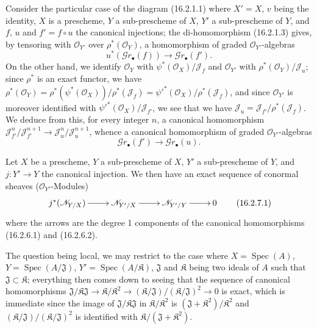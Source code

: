 \begin{env}[16.2.6]
\label{IV.16.2.6}
Consider the particular case of the diagram (16.2.1.1) where $X'=X$, $v$ being
the identity, $X$ is a prescheme, $Y$ a sub-prescheme of $X$, $Y'$ a
sub-prescheme of $Y$, and $f$, $u$ and $f'=f\circ u$ the canonical injections; the
di-homomorphism (16.2.1.3) gives, by tensoring with
$\mathcal{O}_{Y'}$ over $\rho^*(\mathcal{O}_Y)$, a homomorphism of
graded $\mathcal{O}_{Y'}$-algebras
\[
  u^*(\mathscr{G}r_\bullet(f))
  \longrightarrow\mathscr{G}r_\bullet(f').
  \tag{16.2.6.1}
  \label{IV.16.2.6.1}
\]
On the other hand, we identify $\mathcal{O}_Y$ with
$\psi^*(\mathcal{O}_X)/\mathscr{J}_f$ and $\mathcal{O}_{Y'}$ with
$\rho^*(\mathcal{O}_Y)/\mathscr{J}_u$; since $\rho^*$ is an exact functor,
we have
$\rho^*(\mathcal{O}_Y)=
\rho^*(\psi^*(\mathcal{O}_X))/\rho^*(\mathscr{J}_f)=
\psi'^*(\mathcal{O}_X)/\rho^*(\mathscr{J}_f)$, and since
$\mathcal{O}_{Y'}$ is moreover identified with
$\psi'^*(\mathcal{O}_X)/\mathscr{J}_{f'}$, we see that we have
$\mathscr{J}_u=\mathscr{J}_{f'}/\rho^*(\mathscr{J}_f)$. We deduce from this, for
every integer $n$, a canonical homomorphism
$\mathscr{J}_{f'}^n/\mathscr{J}_{f'}^{n+1}\to
\mathscr{J}_u^n/\mathscr{J}_u^{n+1}$, whence a canonical homomorphism of
graded $\mathcal{O}_{Y'}$-algebras
\[
  \mathscr{G}r_\bullet(f')
  \longrightarrow\mathscr{G}r_\bullet(u).
  \tag{16.2.6.2}
  \label{IV.16.2.6.2}
\]
\end{env}

\begin{proposition}[16.2.7]
\label{IV.16.2.7}
Let $X$ be a prescheme, $Y$ a sub-prescheme of $X$, $Y'$ a
sub-prescheme of $Y$, and $j:Y'\to Y$ the canonical injection. We then have an exact
sequence of conormal sheaves ($\mathcal{O}_{Y'}$-Modules)
\[
  \xymatrix{
    j^*(\mathscr{N}_{Y/X}) \ar[r] &
    \mathscr{N}_{Y'/X} \ar[r] &
    \mathscr{N}_{Y'/Y} \ar[r] & 0
  }
  \tag{16.2.7.1}
  \label{IV.16.2.7.1}
\]
where the arrows are the degree 1 components of the canonical homomorphisms
(16.2.6.1) and \textup{(16.2.6.2)}.
\end{proposition}

The question being local, we may restrict to the case where
$X=\operatorname{Spec}(A)$, $Y=\operatorname{Spec}(A/\mathfrak{J})$,
$Y'=\operatorname{Spec}(A/\mathfrak{K})$, $\mathfrak{J}$ and $\mathfrak{K}$
being two ideals of $A$ such that $\mathfrak{J}\subset\mathfrak{K}$; everything
then comes down to seeing
that the sequence of canonical homomorphisms
$\mathfrak{J}/\mathfrak{K}\mathfrak{J}\to
\mathfrak{K}/\mathfrak{K}^2\to
(\mathfrak{K}/\mathfrak{J})/(\mathfrak{K}/\mathfrak{J})^2\to 0$
is exact, which is immediate since the image of
$\mathfrak{J}/\mathfrak{K}\mathfrak{J}$ in
$\mathfrak{K}/\mathfrak{K}^2$ is
$(\mathfrak{J}+\mathfrak{K}^2)/\mathfrak{K}^2$ and
$(\mathfrak{K}/\mathfrak{J})/(\mathfrak{K}/\mathfrak{J})^2$ is identified with
$\mathfrak{K}/(\mathfrak{J}+\mathfrak{K}^2)$.

